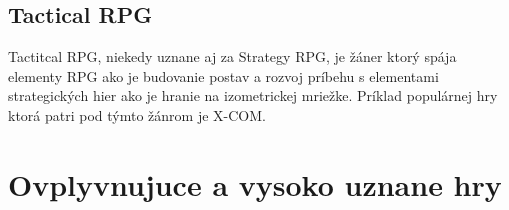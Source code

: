 \documentclass [10pt, twoside, slovak, a4paper] {article}
\begin{document}
\subsection{Tactical RPG}
Tactitcal RPG, niekedy uznane aj za Strategy RPG, je žáner ktorý spája elementy RPG ako je budovanie postav a rozvoj príbehu s elementami strategických hier ako je hranie na izometrickej mriežke. Príklad populárnej hry ktorá patri pod týmto žánrom je X-COM.


\section {Ovplyvnujuce a vysoko uznane hry}

\nocite{*}


\end{document}
